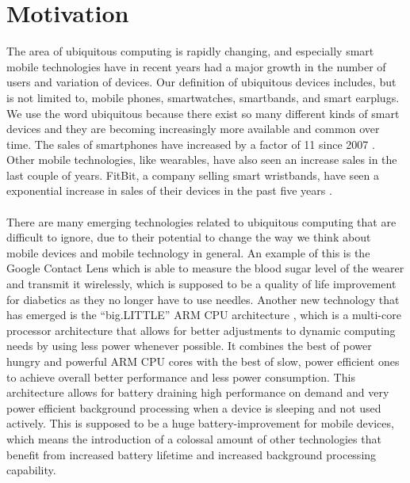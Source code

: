
\chapter{Motivation}
\label{cha:motivation}

The area of ubiquitous computing is rapidly changing, and especially smart mobile technologies have in recent years had a major growth in the number of users and variation of devices. Our definition of ubiquitous devices includes, but is not limited to, mobile phones, smartwatches, smartbands, and smart earplugs. We use the word ubiquitous because there exist so many different kinds of smart devices and they are becoming increasingly more available and common over time. The sales of smartphones have increased by a factor of 11 since 2007 \parencite{statsia_smartphones}. Other mobile technologies, like wearables, have also seen an increase sales in the last couple of years. FitBit, a company selling smart wristbands, have seen a exponential increase in sales of their devices in the past five years \parencite{statsia_fitbit}.
\\\\
There are many emerging technologies related to ubiquitous computing that are difficult to ignore, due to their potential to change the way we think about mobile devices and mobile technology in general. An example of this is the Google Contact Lens \parencite{google_contact_lens} which is able to measure the blood sugar level of the wearer and transmit it wirelessly, which is supposed to be a quality of life improvement for diabetics as they no longer have to use needles. Another new technology that has emerged is the ``big.LITTLE'' ARM CPU architecture \parencite{big_little_architecture}, which is a multi-core processor architecture that allows for better adjustments to dynamic computing needs by using less power whenever possible. It combines the best of power hungry and powerful ARM CPU cores with the best of slow, power efficient ones to achieve overall better performance and less power consumption. This architecture allows for battery draining high performance on demand and very power efficient background processing when a device is sleeping and not used actively. This is supposed to be a huge battery-improvement for mobile devices, which means the introduction of a colossal amount of other technologies that benefit from increased battery lifetime and increased background processing capability. 
